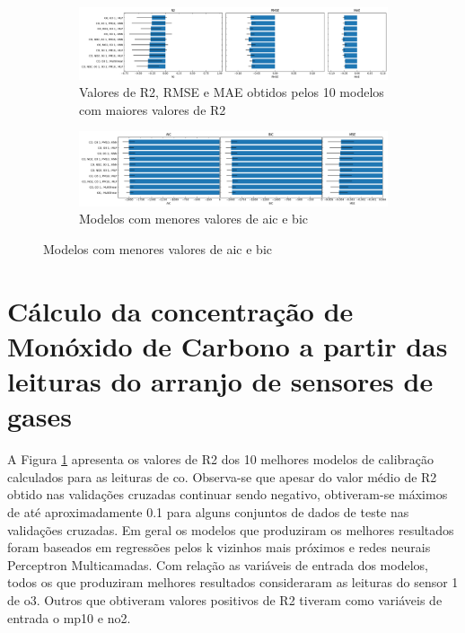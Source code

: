 \begin{figure}[h!]
    \centering
    \caption{Desempenho dos modelos de regressão aplicados para inferir as leituras de concentração de \acrshort{co} medidas pela estação de referência}
    \begin{subfigure}{0.9\textwidth}
        \includegraphics[width=\textwidth]{chapters/4-CALIBRAÇÃO MÚLTIPLOS SENSORES/Figuras/co-all-models-performance.png}
        \caption{Valores de R2, RMSE e MAE obtidos pelos 10 modelos com maiores valores de R2}
        \label{fig:data-co-all-models-performance}
    \end{subfigure}
    \begin{subfigure}{0.9\textwidth}
        \includegraphics[width=\textwidth]{chapters/4-CALIBRAÇÃO MÚLTIPLOS SENSORES/Figuras/co-all-models-complexity.png}
        \caption{Modelos com menores valores de \acrshort{aic} e \acrshort{bic}}
        \label{fig:data-co-all-models-complexity}
    \end{subfigure}
    \label{fig:data-co-all-models-performance-comlexity}
\end{figure}

\section{Cálculo da concentração de Monóxido de Carbono a partir das leituras do arranjo de sensores de gases}

A Figura \ref{fig:data-co-all-models-performance} apresenta os valores de R2 dos 10 melhores modelos de calibração calculados para as leituras de \acrshort{co}. Observa-se que apesar do valor médio de R2 obtido nas validações cruzadas continuar sendo negativo, obtiveram-se máximos de até aproximadamente 0.1 para alguns conjuntos de dados de teste nas validações cruzadas. Em geral os modelos que produziram os melhores resultados foram baseados em regressões pelos k vizinhos mais próximos e redes neurais Perceptron Multicamadas. Com relação as variáveis de entrada dos modelos, todos os que produziram melhores resultados consideraram as leituras do sensor 1 de \acrshort{o3}. Outros que obtiveram valores positivos de R2 tiveram como variáveis de entrada o \acrshort{mp10} e \acrshort{no2}.


